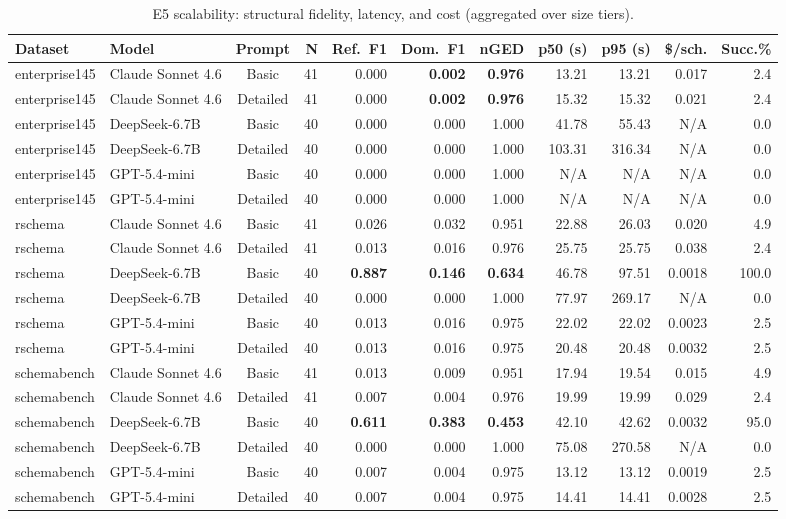 \begin{table}[t]
\centering
\scriptsize
\caption{E5 scalability: structural fidelity, latency, and cost (aggregated over size tiers).}
\label{tab:e5_scalability}
\begin{tabular}{llcrrrrrrrr}
\toprule
Dataset & Model & Prompt & N & Ref.\ F1 & Dom.\ F1 & nGED & p50 (s) & p95 (s) & \$/sch. & Succ.\% \\
\midrule
enterprise145 & Claude Sonnet 4.6 & Basic & 41 & 0.000 & \textbf{0.002} & \textbf{0.976} & 13.21 & 13.21 & 0.017 & 2.4 \\
enterprise145 & Claude Sonnet 4.6 & Detailed & 41 & 0.000 & \textbf{0.002} & \textbf{0.976} & 15.32 & 15.32 & 0.021 & 2.4 \\
enterprise145 & DeepSeek-6.7B & Basic & 40 & 0.000 & 0.000 & 1.000 & 41.78 & 55.43 & N/A & 0.0 \\
enterprise145 & DeepSeek-6.7B & Detailed & 40 & 0.000 & 0.000 & 1.000 & 103.31 & 316.34 & N/A & 0.0 \\
enterprise145 & GPT-5.4-mini & Basic & 40 & 0.000 & 0.000 & 1.000 & N/A & N/A & N/A & 0.0 \\
enterprise145 & GPT-5.4-mini & Detailed & 40 & 0.000 & 0.000 & 1.000 & N/A & N/A & N/A & 0.0 \\
\midrule
rschema & Claude Sonnet 4.6 & Basic & 41 & 0.026 & 0.032 & 0.951 & 22.88 & 26.03 & 0.020 & 4.9 \\
rschema & Claude Sonnet 4.6 & Detailed & 41 & 0.013 & 0.016 & 0.976 & 25.75 & 25.75 & 0.038 & 2.4 \\
rschema & DeepSeek-6.7B & Basic & 40 & \textbf{0.887} & \textbf{0.146} & \textbf{0.634} & 46.78 & 97.51 & 0.0018 & 100.0 \\
rschema & DeepSeek-6.7B & Detailed & 40 & 0.000 & 0.000 & 1.000 & 77.97 & 269.17 & N/A & 0.0 \\
rschema & GPT-5.4-mini & Basic & 40 & 0.013 & 0.016 & 0.975 & 22.02 & 22.02 & 0.0023 & 2.5 \\
rschema & GPT-5.4-mini & Detailed & 40 & 0.013 & 0.016 & 0.975 & 20.48 & 20.48 & 0.0032 & 2.5 \\
\midrule
schemabench & Claude Sonnet 4.6 & Basic & 41 & 0.013 & 0.009 & 0.951 & 17.94 & 19.54 & 0.015 & 4.9 \\
schemabench & Claude Sonnet 4.6 & Detailed & 41 & 0.007 & 0.004 & 0.976 & 19.99 & 19.99 & 0.029 & 2.4 \\
schemabench & DeepSeek-6.7B & Basic & 40 & \textbf{0.611} & \textbf{0.383} & \textbf{0.453} & 42.10 & 42.62 & 0.0032 & 95.0 \\
schemabench & DeepSeek-6.7B & Detailed & 40 & 0.000 & 0.000 & 1.000 & 75.08 & 270.58 & N/A & 0.0 \\
schemabench & GPT-5.4-mini & Basic & 40 & 0.007 & 0.004 & 0.975 & 13.12 & 13.12 & 0.0019 & 2.5 \\
schemabench & GPT-5.4-mini & Detailed & 40 & 0.007 & 0.004 & 0.975 & 14.41 & 14.41 & 0.0028 & 2.5 \\
\bottomrule
\end{tabular}
\end{table}
